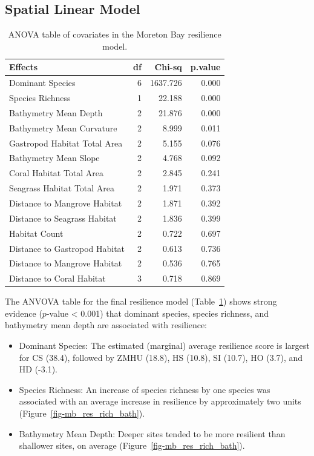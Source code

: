 \documentclass[
  letterpaper,
  DIV=11,
  numbers=noendperiod]{scrartcl}
\providecommand{\tightlist}{%
  \setlength{\itemsep}{0pt}\setlength{\parskip}{0pt}}
\begin{document}
\subsection{Spatial Linear Model}\label{spatial-linear-model}

\begin{longtable}[]{@{}lrrr@{}}

\caption{\label{tbl-mb-res-covariates}ANOVA table of covariates in the
Moreton Bay resilience model.}

\tabularnewline

\toprule\noalign{}
Effects & df & Chi-sq & p.value \\
\midrule\noalign{}
\endhead
\bottomrule\noalign{}
\endlastfoot
Dominant Species & 6 & 1637.726 & 0.000 \\
Species Richness & 1 & 22.188 & 0.000 \\
Bathymetry Mean Depth & 2 & 21.876 & 0.000 \\
Bathymetry Mean Curvature & 2 & 8.999 & 0.011 \\
Gastropod Habitat Total Area & 2 & 5.155 & 0.076 \\
Bathymetry Mean Slope & 2 & 4.768 & 0.092 \\
Coral Habitat Total Area & 2 & 2.845 & 0.241 \\
Seagrass Habitat Total Area & 2 & 1.971 & 0.373 \\
Distance to Mangrove Habitat & 2 & 1.871 & 0.392 \\
Distance to Seagrass Habitat & 2 & 1.836 & 0.399 \\
Habitat Count & 2 & 0.722 & 0.697 \\
Distance to Gastropod Habitat & 2 & 0.613 & 0.736 \\
Distance to Mangrove Habitat & 2 & 0.536 & 0.765 \\
Distance to Coral Habitat & 3 & 0.718 & 0.869 \\

\end{longtable}

The ANVOVA table for the final resilience model
(Table~\ref{tbl-mb-res-covariates}) shows strong evidence (\(p\)-value
\textless{} 0.001) that dominant species, species richness, and
bathymetry mean depth are associated with resilience:

\begin{itemize}
\tightlist
\item
  Dominant Species: The estimated (marginal) average resilience score is
  largest for CS (38.4), followed by ZMHU (18.8), HS (10.8), SI (10.7),
  HO (3.7), and HD (-3.1).
\item
  Species Richness: An increase of species richness by one species was
  associated with an average increase in resilience by approximately two
  units (Figure~\ref{fig-mb_res_rich_bath}).
\item
  Bathymetry Mean Depth: Deeper sites tended to be more resilient than
  shallower sites, on average (Figure~\ref{fig-mb_res_rich_bath}).
\end{itemize}
\end{document}
